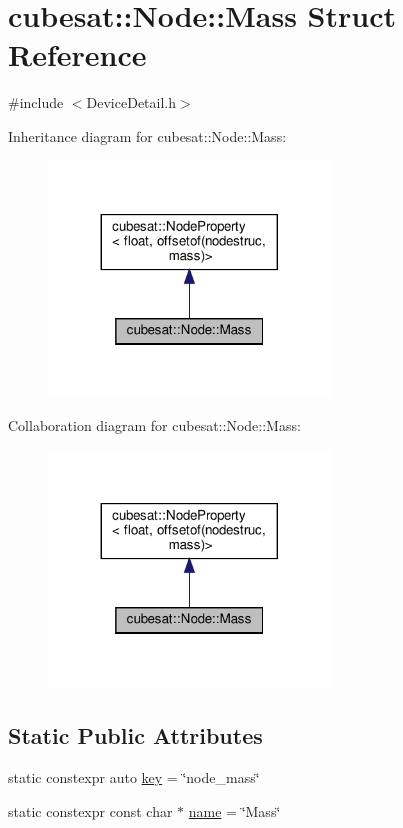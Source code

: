 \hypertarget{structcubesat_1_1Node_1_1Mass}{}\section{cubesat\+:\+:Node\+:\+:Mass Struct Reference}
\label{structcubesat_1_1Node_1_1Mass}


{\ttfamily \#include $<$Device\+Detail.\+h$>$}



Inheritance diagram for cubesat\+:\+:Node\+:\+:Mass\+:
\nopagebreak
\begin{figure}[H]
\begin{center}
\leavevmode
\includegraphics[width=212pt]{structcubesat_1_1Node_1_1Mass__inherit__graph}
\end{center}
\end{figure}


Collaboration diagram for cubesat\+:\+:Node\+:\+:Mass\+:
\nopagebreak
\begin{figure}[H]
\begin{center}
\leavevmode
\includegraphics[width=212pt]{structcubesat_1_1Node_1_1Mass__coll__graph}
\end{center}
\end{figure}
\subsection*{Static Public Attributes}
\begin{DoxyCompactItemize}
\item 
static constexpr auto \hyperlink{structcubesat_1_1Node_1_1Mass_a4d87240a8d3d25bfeb5ec3e04bcdd6c4}{key} = \char`\"{}node\+\_\+mass\char`\"{}
\item 
static constexpr const char $\ast$ \hyperlink{structcubesat_1_1Node_1_1Mass_a032a7d325e46b57cd6ba184e1555d95b}{name} = \char`\"{}Mass\char`\"{}
\end{DoxyCompactItemize}
